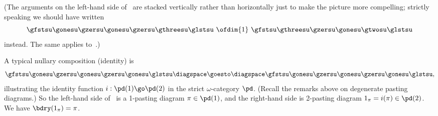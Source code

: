 (The arguments on the left-hand side of~ are stacked
vertically rather than horizontally just to make the picture more
compelling; strictly speaking we should have written
\[
\gfstsu\gonesu\gzersu\gonesu\gzersu\gthreesu\glstsu
\ \ofdim{1} \ 
\gfstsu\gthreesu\gzersu\gonesu\gtwosu\glstsu
\]
instead.  The same applies to~.)

A typical nullary%
%
%
composition (identity) is
%
\begin{equation}	\label{eq:typical-id}
\gfstsu\gonesu\gzersu\gonesu\gzersu\gonesu\glstsu
\diagspace \goesto \diagspace 	
\gfstsu\gonesu\gzersu\gonesu\gzersu\gonesu\glstsu,
\end{equation}
% 
illustrating the identity function $i: \pd(1) \go \pd(2)$ in the strict
$\omega$-category $\pd$.  (Recall the remarks above on degenerate%
%
%
pasting
diagrams.)  So the left-hand side of~ is a 1-pasting
diagram $\pi\in\pd(1)$, and the right-hand side is 2-pasting diagram $1_\pi
= i(\pi) \in \pd(2)$.  We have $\bdry(1_\pi) = \pi$.%
%

